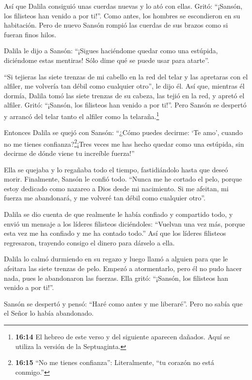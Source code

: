  Así que Dalila consiguió unas cuerdas nuevas y lo ató con
ellas. Gritó: ``¡Sansón, los filisteos han venido a por ti!''. Como
antes, los hombres se escondieron en su habitación. Pero de nuevo Sansón
rompió las cuerdas de sus brazos como si fueran finos hilos.

 Dalila le dijo a Sansón: ``¡Sigues haciéndome quedar como
una estúpida, diciéndome estas mentiras! Sólo dime qué se puede usar
para atarte''.

``Si tejieras las siete trenzas de mi cabello en la red del telar y las
apretaras con el alfiler, me volvería tan débil como cualquier otro'',
le dijo él. Así que, mientras él dormía, Dalila tomó las siete trenzas
de su cabeza, las tejió en la red,  y apretó el alfiler.
Gritó: ``¡Sansón, los filisteos han venido a por ti!''. Pero Sansón se
despertó y arrancó del telar tanto el alfiler como la
telaraña.\footnote{\textbf{16:14} El hebreo de este verso y del
  siguiente aparecen dañados. Aquí se utiliza la versión de la
  Septuaginta.}

 Entonces Dalila se quejó con Sansón: ``¿Cómo puedes
decirme: `Te amo', cuando no me tienes confianza?\footnote{\textbf{16:15}
  ``No me tienes confianza'': Literalmente, ``tu corazón no está
  conmigo.''}¡Tres veces me has hecho quedar como una estúpida, sin
decirme de dónde viene tu increíble fuerza!''

 Ella se quejaba y lo regañaba todo el tiempo,
fastidiándolo hasta que deseó morir.  Finalmente, Sansón le
confió todo. ``Nunca me he cortado el pelo, porque estoy dedicado como
nazareo a Dios desde mi nacimiento. Si me afeitan, mi fuerza me
abandonará, y me volveré tan débil como cualquier otro''.

 Dalila se dio cuenta de que realmente le había confiado y
compartido todo, y envió un mensaje a los líderes filisteos diciéndoles:
``Vuelvan una vez más, porque esta vez me ha confiado y me ha contado
todo.'' Así que los líderes filisteos regresaron, trayendo consigo el
dinero para dárselo a ella.

 Dalila lo calmó durmiendo en su regazo y luego llamó a
alguien para que le afeitara las siete trenzas de pelo. Empezó a
atormentarlo, pero él no pudo hacer nada, pues le abandonaron las
fuerzas.  Ella gritó: ``¡Sansón, los filisteos han venido a
por ti!''.

Sansón se despertó y pensó: ``Haré como antes y me liberaré''. Pero no
sabía que el Señor lo había abandonado.

